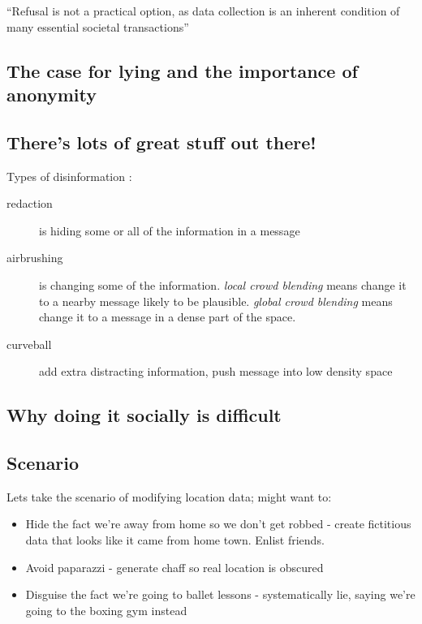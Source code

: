 \documentclass{IOS-Book-Article}     %
\begin{document}
``Refusal is not a practical option, as data collection is an inherent condition
of many essential societal transactions''
\cite{brunton2011vernacular}

\subsection{The case for lying and the importance of anonymity}

\subsection{There's lots of great stuff out there!} 

Types of disinformation \cite{alexander2010Disinformation}:
\begin{description}
  \item[redaction] is hiding some or all of the information in a message
  \item[airbrushing] is changing some of the information. \emph{local crowd
  blending} means change it to a nearby message likely to be plausible.
  \emph{global crowd blending} means change it to a message in a dense part of
  the space.
  \item[curveball] add extra distracting information, push message into low
  density space
\end{description}

\subsection{Why doing it socially is difficult}

\subsection{Scenario}

Lets take the scenario of modifying location data; might want to:
\begin{itemize}
  \item Hide the fact we're away from home so we don't get robbed - create
  fictitious data that looks like it came from home town. Enlist friends.
  \item Avoid paparazzi - generate chaff so real location is obscured
  \item Disguise the fact we're going to ballet lessons - systematically lie,
  saying we're going to the boxing gym instead
\end{itemize}
\end{document}
